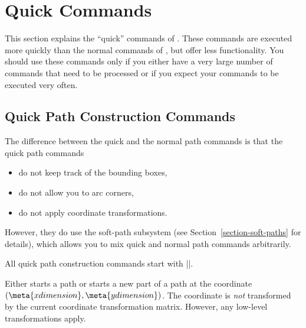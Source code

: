 %


\section{Quick Commands}

This section explains the ``quick'' commands of \pgfname. These
commands are executed more quickly than the normal commands of
\pgfname, but offer less functionality. You should use these commands
only if you either have a very large number of commands that need to
be processed or if you expect your commands to be executed very often.



\subsection{Quick Path Construction Commands}

The difference between the quick and the normal path commands is that
the quick path commands
\begin{itemize}
\item
  do not keep track of the bounding boxes,
\item
  do not allow you to arc corners,
\item
  do not apply coordinate transformations.
\end{itemize}

However, they do use the soft-path subsystem (see
Section~\ref{section-soft-paths} for details), which allows you to mix
quick and normal path commands arbitrarily.

All quick path construction commands start with |\pgfpathq|.

\begin{command}{\pgfpathqmoveto{}}
  Either starts a path or starts a new part of a path at the coordinate
  $(\meta{x dimension},\meta{y dimension})$. The coordinate is
  \emph{not} transformed by the current coordinate transformation
  matrix. However, any low-level transformations apply.

\begin{codeexample}[]
\end{codeexample}
\end{command}

